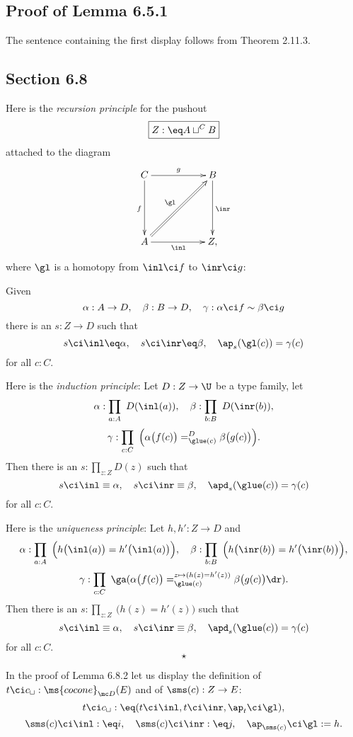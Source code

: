 \documentclass[12pt]{article}
\begin{document}

\subsection{Proof of Lemma 6.5.1}

The sentence containing the first display follows from Theorem 2.11.3.


\subsection{Section 6.8}

Here is the \emph{recursion principle} for the pushout 
$$
\boxed{Z:\eq A\sqcup^CB}
$$ 
attached to the diagram 
$$
\xymatrix{
C\ar[rr]^g\ar[dd]_f&&B\ar[dd]^{\inr}\\ \\ 
A\ar[rr]_{\inl}\ar@{=>}[uurr]^{\gl}&&Z,
}
$$ 
where $\gl$ is a homotopy from $\inl\ci f$ to $\inr\ci g$: 

Given 
$$
\alpha:A\to D,\quad\beta:B\to D,\quad\gamma:\alpha\ci f\sim\beta\ci g
$$ 
there is an $s:Z\to D$ such that 
$$
s\ci\inl\eq\alpha,\quad s\ci\inr\eq\beta,\quad\ap_s(\gl(c))=\gamma(c)
$$ 
for all $c:C$.

Here is the \emph{induction principle}: Let $D:Z\to\U$ be a type family, let 
$$
\alpha:\prod_{a:A}\ D(\inl(a)),\quad\beta:\prod_{b:B}\ D(\inr(b)),
$$
$$
\gamma:\prod_{c:C}\ \Big(\alpha\big(f(c)\big)=^D_{\glue(c)}\beta\big(g(c)\big)\Big).
$$ 
Then there is an $s:\prod_{z:Z}D(z)$ such that 
$$
s\ci\inl\equiv\alpha,\quad s\ci\inr\equiv\beta,\quad\apd_s(\glue(c))=\gamma(c)
$$ 
for all $c:C$. 

Here is the \emph{uniqueness principle}: Let $h,h':Z\to D$ and 
$$
\alpha:\prod_{a:A}\ \Big(h\big(\inl(a)\big)=h'\big(\inl(a)\big)\Big),\quad\beta:\prod_{b:B}\ \Big(h\big(\inr(b)\big)=h'\big(\inr(b)\big)\Big),
$$
$$
\gamma:\prod_{c:C}\ \ga(\alpha\big(f(c)\big)=^{z\mapsto(h(z)=h'(z))}_{\glue(c)}\beta\big(g(c)\big)\dr).
$$ 
Then there is an $s:\prod_{z:Z}\ \big(h(z)=h'(z)\big)$ such that 
$$
s\ci\inl\equiv\alpha,\quad s\ci\inr\equiv\beta,\quad\apd_s(\glue(c))=\gamma(c)
$$ 
for all $c:C$.  
$$
\star
$$

In the proof of Lemma 6.8.2 let us display the definition of $t\ci c_{\sqcup}:\ms{cocone}_{\mc D}(E)$ and of $\sms(c):Z\to E$: 
$$
t\ci c_{\sqcup}:\eq(t\ci\inl,t\ci\inr,\ap_t\ci\gl),
$$ 
$$
\sms(c)\ci\inl:\eq i,\quad\sms(c)\ci\inr :\eq j,\quad\ap_{\sms(c)}\ci\gl:=h.
$$ 
\end{document}
